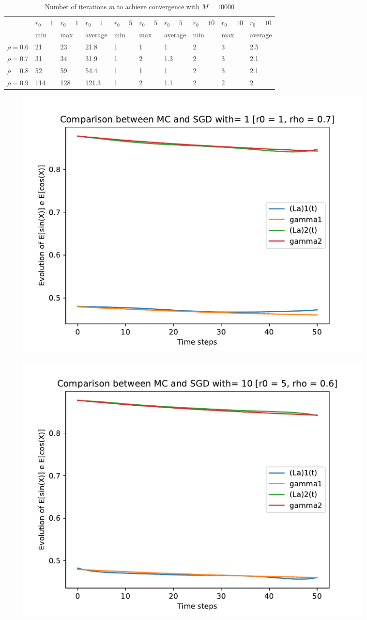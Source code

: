 \documentclass[a4paper,11pt,openright]{report}
\begin{document}
\begin{table}[H]
\centering
\addtolength{\leftskip}{-1.5cm}
\addtolength{\rightskip}{-1.5cm}
\begin{tabular}{|c|lllllllll|}
\hline
$ $ & $r_0 = 1$ & $r_0 = 1$ & $r_0 = 1$ & $r_0 = 5$ & $r_0 = 5$ & $r_0 = 5$ & $r_0 = 10$ & $r_0 = 10$ & $r_0 = 10$  \\
$ $ & min & max & average & min & max & average & min & max & average \\ 
\hline
$\rho = 0.6$ & 21 & 23 & 21.8 & 1 & 1 & 1 & 2 & 3 & 2.5\\

$\rho = 0.7$ & 31 & 34 & 31.9 & 1 & 2 & 1.3 & 2 & 3 & 2.1\\

$\rho = 0.8$ & 52 & 59 & 54.4 & 1 & 1 & 1 & 2 & 3 & 2.1\\

$\rho = 0.9$ & 114 & 128 & 121.3 & 1 & 2 & 1.1 & 2 & 2 & 2\\
\hline
\end{tabular}
\caption{Number of iterations $m$ to achieve convergence with $M = 10000$}
\end{table}
\begin{figure}[H]
\centering
\includegraphics[width=0.9\textwidth]{images/graphics T = 0.5/n = 6, M = 1 sine and cosine.pdf}
\end{figure}
\begin{figure}[H]
\centering
\includegraphics[width=0.9\textwidth]{images/graphics T = 0.5/n = 6, M = 10 sine and cosine.pdf}
\end{figure}
\end{document}
